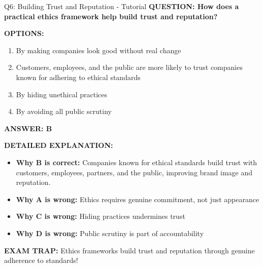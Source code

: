 \documentclass[8pt]{beamer}
\begin{document}
	\begin{frame}{Q6: Building Trust and Reputation - Tutorial}
		\fontsize{6.5}{7.5}\selectfont
		\textbf{QUESTION: How does a practical ethics framework help build trust and reputation?}
		
		\vspace{0.1cm}
		\textbf{OPTIONS:}
		\begin{enumerate}
			\item By making companies look good without real change
			\item Customers, employees, and the public are more likely to trust companies known for adhering to ethical standards
			\item By hiding unethical practices
			\item By avoiding all public scrutiny
		\end{enumerate}
		
		\vspace{0.1cm}
		\textcolor{myblue}{\textbf{ANSWER: B}}
		
		\vspace{0.1cm}
		\textbf{DETAILED EXPLANATION:}
		\begin{itemize}
			\item \textbf{Why B is correct:} Companies known for ethical standards build trust with customers, employees, partners, and the public, improving brand image and reputation.
			\item \textbf{Why A is wrong:} Ethics requires genuine commitment, not just appearance
			\item \textbf{Why C is wrong:} Hiding practices undermines trust
			\item \textbf{Why D is wrong:} Public scrutiny is part of accountability
		\end{itemize}
		
		\textcolor{myred}{\textbf{EXAM TRAP:}} Ethics frameworks build \textcolor{myblue}{trust and reputation} through genuine adherence to standards!
	\end{frame}
	
\end{document}
